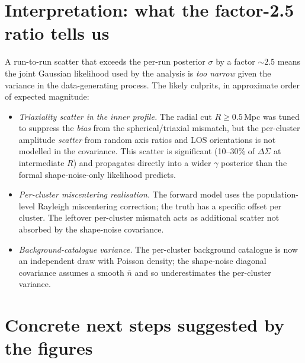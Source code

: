 \documentclass[11pt,a4paper]{article}
\newcommand{\dsig}{\Delta\Sigma}
\begin{document}
\section{Interpretation: what the factor-2.5 ratio tells us}

A run-to-run scatter that exceeds the per-run posterior $\sigma$ by a factor
$\sim 2.5$ means the joint Gaussian likelihood used by the analysis is
\emph{too narrow} given the variance in the data-generating process.  The
likely culprits, in approximate order of expected magnitude:

\begin{itemize}[noitemsep]
  \item \textit{Triaxiality scatter in the inner profile.}  The radial cut
        $R \geq 0.5$\,Mpc was tuned to suppress the \emph{bias} from the
        spherical/triaxial mismatch, but the per-cluster amplitude
        \emph{scatter} from random axis ratios and LOS orientations is not
        modelled in the covariance.  This scatter is significant (10--30\%
        of $\dsig$ at intermediate $R$) and propagates directly into a
        wider $\gamma$ posterior than the formal shape-noise-only
        likelihood predicts.
  \item \textit{Per-cluster miscentering realisation.}  The forward model
        uses the population-level Rayleigh miscentering correction; the
        truth has a specific offset per cluster.  The leftover per-cluster
        mismatch acts as additional scatter not absorbed by the
        shape-noise covariance.
  \item \textit{Background-catalogue variance.}  The per-cluster background
        catalogue is now an independent draw with Poisson density; the
        shape-noise diagonal covariance assumes a smooth $\bar n$ and so
        underestimates the per-cluster variance.
\end{itemize}

\section{Concrete next steps suggested by the figures}
\end{document}
